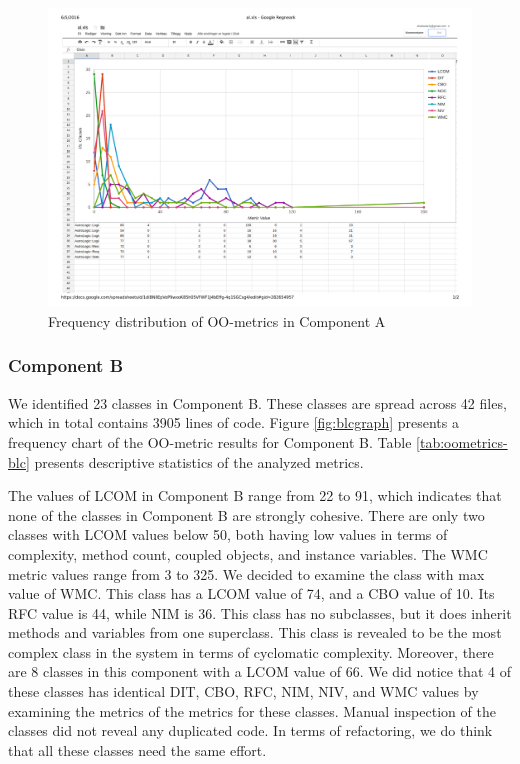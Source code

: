 

\begin{landscape}
\setlength\LTleft{-.5in}
	\begin{figure}
	\centering
	\includegraphics[width=\textwidth]{images/pdf/al.pdf}
	\caption{Frequency distribution of OO-metrics in Component A}
	\label{fig:algraph}
	\end{figure}
\end{landscape}



\subsubsection{Component B}
We identified 23 classes in Component B. These classes are spread across 42 files, which in total contains 3905 lines of code. Figure \ref{fig:blcgraph} presents a frequency chart of the OO-metric results for Component B. Table \ref{tab:oometrics-blc} presents descriptive statistics of the analyzed metrics.

The values of LCOM in Component B range from 22 to 91, which indicates that none of the classes in Component B are strongly cohesive. There are only two classes with LCOM values below 50, both having low values in terms of complexity, method count, coupled objects, and instance variables. The WMC metric values range from 3 to 325. We decided to examine the class with max value of WMC. This class has a LCOM value of 74, and a CBO value of 10. Its RFC value is 44, while NIM is 36. This class has no subclasses, but it does inherit methods and variables from one superclass. This class is revealed to be the most complex class in the system in terms of cyclomatic complexity. Moreover, there are 8 classes in this component with a LCOM value of 66. We did notice that 4 of these classes has identical DIT, CBO, RFC, NIM, NIV, and WMC values by examining the metrics of the metrics for these classes. Manual inspection of the classes did not reveal any duplicated code. In terms of refactoring, we do think that all these classes need the same effort.

